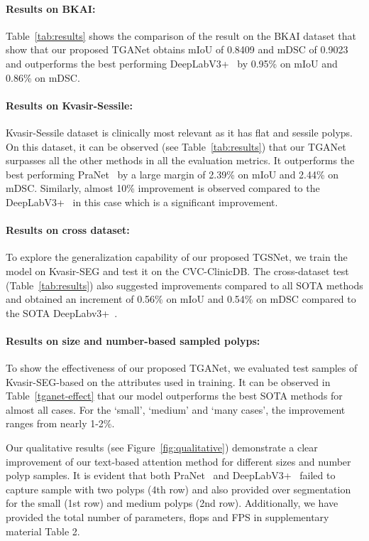 \documentclass[runningheads]{llncs}
\begin{document}
\paragraph{\textbf{Results on BKAI:}}
Table~\ref{tab:results} shows the comparison of the result on the BKAI dataset that show that our proposed TGANet obtains mIoU of 0.8409 and mDSC of 0.9023 and outperforms the best performing DeepLabV3+~\cite{chen2018encoder} by 0.95\% on mIoU and 0.86\% on mDSC. 
\vspace{-3mm}
\paragraph{\textbf{Results on Kvasir-Sessile:}}
Kvasir-Sessile dataset is clinically most relevant as it has flat and sessile polyps. On this dataset, it can be observed (see Table~\ref{tab:results}) that our TGANet surpasses all the other methods in all the evaluation metrics. It outperforms the best performing PraNet~\cite{fan2020pranet} by a large margin of 2.39\% on mIoU and 2.44\% on mDSC. Similarly, almost 10\% improvement is observed compared to the DeepLabV3+~\cite{chen2018encoder} in this case which is a significant improvement. 
\vspace{-3mm}
\paragraph{\textbf{Results on cross dataset:}}
To explore the generalization capability of our proposed TGSNet, we train the model on Kvasir-SEG and test it on the CVC-ClinicDB. The cross-dataset test (Table~\ref{tab:results}) also suggested improvements compared to all SOTA methods and obtained an increment of 0.56\% on mIoU and 0.54\% on mDSC compared to the SOTA DeepLabv3+~\cite{chen2018encoder}. 
\vspace{-3mm}

\paragraph{\textbf{Results on size and number-based sampled polyps:}}
To show the effectiveness of our proposed TGANet, we evaluated test samples of Kvasir-SEG-based on the attributes used in training. It can be observed in Table~\ref{tganet-effect} that our model outperforms the best SOTA methods for almost all cases. For the `small', `medium' and `many cases', the improvement ranges from nearly 1-2\%. 

Our qualitative results (see Figure~\ref{fig:qualitative}) demonstrate a clear improvement of our text-based attention method for different sizes and number polyp samples. It is evident that both PraNet~\cite{fan2020pranet} and DeepLabV3+~\cite{chen2018encoder} failed to capture sample with two polyps (4th row) and also provided over segmentation for the small (1st row) and medium polyps (2nd row). Additionally, we have provided the total number of parameters, flops and FPS in {supplementary material Table 2}. 
\end{document}
